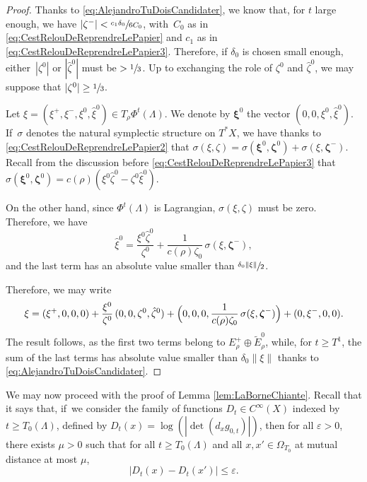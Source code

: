 \documentclass[JEP,XML,SOM,Unicode,published]{cedram}
\theoremstyle{plain}
\theoremstyle{definition}
\begin{document}
\begin{proof}
Thanks to \eqref{eq:AlejandroTuDoisCandidater}, we know that, for $t$ large enough, we have $|\zeta^-|< \sfrac{c_1 \delta_0}{6C_0}$, with~$C_0$ as in \eqref{eq:CestRelouDeReprendreLePapier} and $c_1$ as in \eqref{eq:CestRelouDeReprendreLePapier3}. Therefore, if $\delta_0$ is chosen small enough, either~$|\zeta^0|$ or $|\hat{\zeta}^0|$ must be $> \sfrac{1}{3}$. Up to exchanging the role of $\zeta^0$ and $\hat{\zeta}^0$, we may suppose that $|\zeta^0| \geq \sfrac{1}{3}$.

Let $\xi= (\xi^+, \xi^-, \xi^0, \hat{\xi}^0)\in T_\rho \Phi^t(\Lambda)$. We denote by $\boldsymbol{\xi}^0$ the vector $(0, 0, \xi^0, \hat{\xi}^0)$.
If~$\sigma$ denotes the natural symplectic structure on $T^*X$, we have thanks to \eqref{eq:CestRelouDeReprendreLePapier2} that $\sigma(\xi, \zeta)= \sigma(\boldsymbol{\xi}^0, \boldsymbol{\zeta}^0) + \sigma(\xi, \boldsymbol{\zeta}^-)$. Recall from the discussion before \eqref{eq:CestRelouDeReprendreLePapier3} that $\sigma(\boldsymbol{\xi}^0, \boldsymbol{\zeta}^0)= c(\rho)(\xi^0 \hat{\zeta}^0 - \zeta^0 \hat{\xi}^0)$.

On the other hand, since $\Phi^t(\Lambda)$ is Lagrangian, $\sigma(\xi, \zeta)$ must be zero. Therefore, we have
\begin{equation}
\hat{\xi}^0 = \frac{ \xi^0 \hat{\zeta}^0}{\zeta^0} + \frac{1}{c(\rho) \zeta_0}\, \sigma(\xi, \boldsymbol{\zeta}^-),
\end{equation}
and the last term has an absolute value smaller than $\sfrac{\delta_0\|\xi\|}{2} $.

Therefore, we may write
\[
\xi = (\xi^+, 0, 0, 0) + \frac{\xi^0}{\zeta^0}\, (0, 0, \zeta^0, \hat{\zeta}^0) + \Bigl(0,0,0, \frac{1}{c(\rho)\zeta_0}\, \sigma(\xi, \boldsymbol{\zeta}^-)\Bigr) + (0, \xi^-, 0,0).
\]
The result follows, as the first two terms belong to $E_\rho^+\oplus \tilde{E}_\rho^0$, while, for $t\geq T^1$, the sum of the last terms has absolute value smaller than $\delta_0 \|\xi\|$ thanks to \eqref{eq:AlejandroTuDoisCandidater}.
\end{proof}

We may now proceed with the proof of Lemma \ref{lem:LaBorneChiante}. Recall that it says that, if~we consider the family of functions $D_t\in C^\infty(X)$ indexed by $t\geq T_0(\Lambda)$, defined by $D_t(x)=\log(|{\det}(d_x g_{0,t})|)$, then for all $\varepsilon>0$, there exists $\mu>0$ such that for all $t\geq T_0(\Lambda)$ and all $x,x'\in \Omega_{T_0}$ at mutual distance at most $\mu$,\vspace*{-2pt}
\begin{equation}\label{eq:unif_cont}
|D_t(x)-D_t(x')|\leq \varepsilon.
\end{equation}
\end{document}
